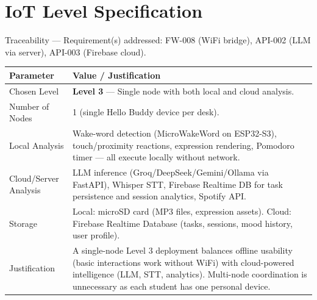 \documentclass[12pt,a4paper]{article}
\begin{document}
\newpage
\section{IoT Level Specification}

\begin{tracebox}
Traceability --- Requirement(s) addressed: FW-008 (WiFi bridge),
API-002 (LLM via server), API-003 (Firebase cloud).
\end{tracebox}

\vspace{0.3cm}

\begin{center}
\label{tab:iotlevel}
\begin{tabular}{|L{0.20\textwidth}|L{0.68\textwidth}|}
\hline
\textbf{Parameter} & \textbf{Value / Justification} \\ \hline
Chosen Level & \textbf{Level 3} --- Single node with both local and
               cloud analysis. \\ \hline
Number of Nodes & 1 (single Hello Buddy device per desk). \\ \hline
Local Analysis & Wake-word detection (MicroWakeWord on ESP32-S3),
                 touch/proximity reactions, expression rendering,
                 Pomodoro timer --- all execute locally without
                 network. \\ \hline
Cloud/Server Analysis & LLM inference (Groq/DeepSeek/Gemini/Ollama
                        via FastAPI), Whisper STT, Firebase Realtime DB
                        for task persistence and session analytics,
                        Spotify API. \\ \hline
Storage & Local: microSD card (MP3 files, expression assets).
          Cloud: Firebase Realtime Database (tasks, sessions, mood
          history, user profile). \\ \hline
Justification & A single-node Level 3 deployment balances offline
                usability (basic interactions work without WiFi) with
                cloud-powered intelligence (LLM, STT, analytics).
                Multi-node coordination is unnecessary as each student
                has one personal device. \\ \hline
\end{tabular}
\end{center}
\end{document}
